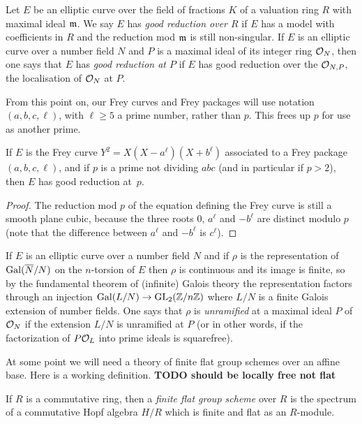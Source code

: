 \begin{definition}\label{good_reduction} Let $E$ be an elliptic curve over the field of fractions $K$ of a valuation ring $R$ with maximal ideal $\mathfrak{m}$. We say $E$ has \emph{good reduction over $R$} if $E$ has a model with 
coefficients in $R$ and the reduction mod $\mathfrak{m}$ is still non-singular. If $E$ is an elliptic curve 
over a number field $N$ and $P$ is a maximal ideal of its integer ring $\mathcal{O}_N$, then one says that $E$ has \emph{good reduction at $P$} if $E$ has good reduction over the $\mathcal{O}_{N,P}$, the localisation of $\mathcal{O}_N$ at $P$.
\end{definition}

\begin{remark} From this point on, our Frey curves and Frey packages will use notation $(a,b,c,\ell)$, with $\ell\geq 5$ a prime number, rather than $p$. This frees up $p$ for use as another prime.
\end{remark}

\begin{lemma}\label{Frey_curve_good_reduction} If $E$ is the Frey curve $Y^2=X(X-a^\ell)(X+b^\ell)$ associated to a
  Frey package $(a,b,c,\ell)$, and if $p$ is a prime
  not dividing $abc$ (and in particular if $p>2$), then $E$ has good reduction at~$p$.
\end{lemma}
\begin{proof} The reduction mod $p$ of the equation defining the Frey curve is still a smooth
  plane cubic, because the three roots $0$, $a^\ell$ and $-b^\ell$ are distinct modulo $p$
  (note that the difference between $a^\ell$ and $-b^\ell$ is $c^\ell$). 
\end{proof}

If $E$ is an elliptic curve over a number field $N$ and if $\rho$ is the representation
of $\operatorname{Gal}(\overline{N}/N)$ on the $n$-torsion of $E$ then $\rho$ is continuous and its image is finite,
so by the fundamental theorem of (infinite) Galois theory the representation factors through an
injection $\operatorname{Gal}(L/N)\to\operatorname{GL}_2(\mathbb{Z}/n\mathbb{Z})$ where $L/N$ is a finite Galois extension of
number fields. One says that $\rho$ is \emph{unramified} at a maximal ideal $P$ of $\mathcal{O}_N$
if the extension $L/N$ is unramified at $P$ (or in other words, if the factorization
of $P\mathcal{O}_L$ into prime ideals is squarefree).

At some point we will need a theory of finite flat group schemes over an affine base. Here
is a working definition. {\bf TODO should be locally free not flat}

\begin{definition}\label{finite_flat_group_scheme} If $R$ is a commutative ring, then
  a \emph{finite flat group scheme} over $R$ is the spectrum of a commutative Hopf algebra $H/R$ 
  which is finite and flat as an $R$-module.
\end{definition}


